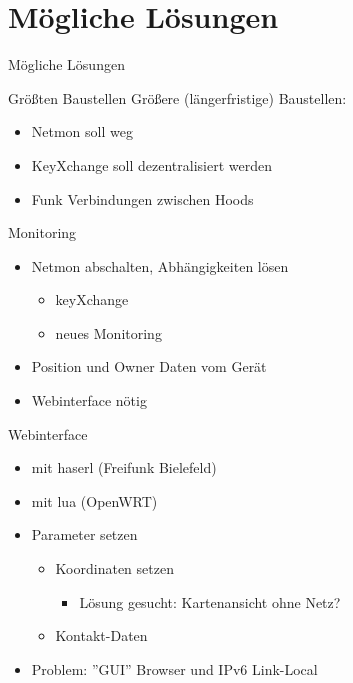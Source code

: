 \section{Mögliche Lösungen}
\begin{frame}{}
    \begin{center}
        Mögliche Lösungen
     \end{center}
\end{frame}

\begin{frame}{Größten Baustellen}
    Größere (längerfristige) Baustellen:
    \begin{itemize}
        \item Netmon soll weg
        \item KeyXchange soll dezentralisiert werden
        \item Funk Verbindungen zwischen Hoods
    \end{itemize}
\end{frame}

\begin{frame}{Monitoring}
    \begin{itemize}
        \item Netmon abschalten, Abhängigkeiten lösen
        \begin{itemize}
            \item keyXchange
            \item neues Monitoring
        \end{itemize}
        \item Position und Owner Daten vom Gerät
        \item Webinterface nötig
    \end{itemize}
\end{frame}

\begin{frame}{Webinterface}
    \begin{itemize}
        \item \zb{} mit haserl (Freifunk Bielefeld)
        \item \zb{} mit lua (OpenWRT)
        \item Parameter setzen
        \begin{itemize}
            \item Koordinaten setzen
                \begin{itemize}
                    \item Lösung gesucht: Kartenansicht ohne Netz?
                \end{itemize}
            \item Kontakt-Daten
        \end{itemize}
        \item Problem: ''GUI'' Browser und IPv6 Link-Local
    \end{itemize}
\end{frame}

